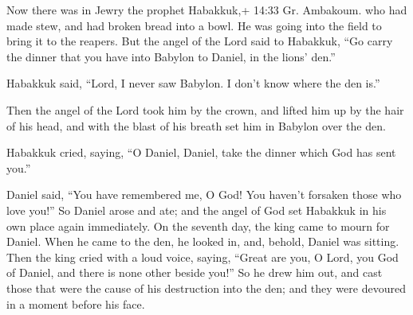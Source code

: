  Now there was in Jewry the prophet Habakkuk,+ 14:33 Gr.
Ambakoum. who had made stew, and had broken bread into a bowl. He was
going into the field to bring it to the reapers.  But the
angel of the Lord said to Habakkuk, ``Go carry the dinner that you have
into Babylon to Daniel, in the lions' den.''

 Habakkuk said, ``Lord, I never saw Babylon. I don't know
where the den is.''

 Then the angel of the Lord took him by the crown, and
lifted him up by the hair of his head, and with the blast of his breath
set him in Babylon over the den.

 Habakkuk cried, saying, ``O Daniel, Daniel, take the
dinner which God has sent you.''

 Daniel said, ``You have remembered me, O God! You haven't
forsaken those who love you!''  So Daniel arose and ate;
and the angel of God set Habakkuk in his own place again immediately.
 On the seventh day, the king came to mourn for Daniel.
When he came to the den, he looked in, and, behold, Daniel was sitting.
 Then the king cried with a loud voice, saying, ``Great are
you, O Lord, you God of Daniel, and there is none other beside you!''
 So he drew him out, and cast those that were the cause of
his destruction into the den; and they were devoured in a moment before
his face.
